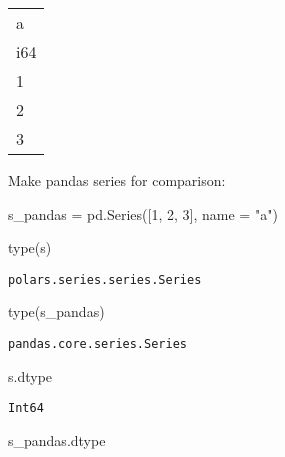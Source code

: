 \documentclass[
  letterpaper,
  DIV=11,
  numbers=noendperiod]{scrartcl}
\newenvironment{Shaded}{\begin{snugshade}}{\end{snugshade}}
\newcommand{\BuiltInTok}[1]{\textcolor[rgb]{0.00,0.23,0.31}{#1}}
\newcommand{\DecValTok}[1]{\textcolor[rgb]{0.68,0.00,0.00}{#1}}
\newcommand{\NormalTok}[1]{\textcolor[rgb]{0.00,0.23,0.31}{#1}}
\newcommand{\OperatorTok}[1]{\textcolor[rgb]{0.37,0.37,0.37}{#1}}
\newcommand{\StringTok}[1]{\textcolor[rgb]{0.13,0.47,0.30}{#1}}
\begin{document}
\begin{longtable}[]{@{}l@{}}
\toprule()
a \\
i64 \\
\midrule()
\endhead
1 \\
2 \\
3 \\
\bottomrule()
\end{longtable}

Make pandas series for comparison:

\begin{Shaded}
\begin{Highlighting}[]
\NormalTok{s\_pandas }\OperatorTok{=}\NormalTok{ pd.Series([}\DecValTok{1}\NormalTok{, }\DecValTok{2}\NormalTok{, }\DecValTok{3}\NormalTok{], name }\OperatorTok{=} \StringTok{"a"}\NormalTok{)}
\end{Highlighting}
\end{Shaded}

\begin{Shaded}
\begin{Highlighting}[]
\BuiltInTok{type}\NormalTok{(s)}
\end{Highlighting}
\end{Shaded}

\begin{verbatim}
polars.series.series.Series
\end{verbatim}

\begin{Shaded}
\begin{Highlighting}[]
\BuiltInTok{type}\NormalTok{(s\_pandas)}
\end{Highlighting}
\end{Shaded}

\begin{verbatim}
pandas.core.series.Series
\end{verbatim}

\begin{Shaded}
\begin{Highlighting}[]
\NormalTok{s.dtype}
\end{Highlighting}
\end{Shaded}

\begin{verbatim}
Int64
\end{verbatim}

\begin{Shaded}
\begin{Highlighting}[]
\NormalTok{s\_pandas.dtype}
\end{Highlighting}
\end{Shaded}
\end{document}
